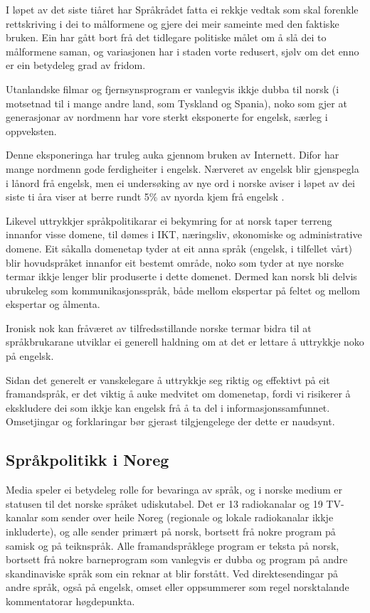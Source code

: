 \begin{multicols}{2}
I løpet av det siste tiåret har Språkrådet fatta ei rekkje vedtak som skal forenkle rettskriving i dei to målformene og gjere dei meir sameinte med den faktiske bruken. Ein har gått bort frå det tidlegare politiske målet om å slå dei to målformene saman, og variasjonen har i staden vorte redusert, sjølv om det enno er ein betydeleg grad av fridom. 

Utanlandske filmar og fjernsynsprogram er vanlegvis ikkje dubba til norsk (i motsetnad til i mange andre land, som Tyskland og Spania), noko som gjer at generasjonar av nordmenn har vore sterkt eksponerte for engelsk, særleg i oppveksten. 

Denne eksponeringa har truleg auka gjennom bruken av Internett. 
Difor har mange nordmenn gode ferdigheiter i engelsk. 
Nærveret av engelsk blir gjenspegla i lånord frå engelsk, men ei undersøking av nye ord i norske aviser i løpet av dei siste ti åra viser at berre rundt 5\% av nyorda kjem frå engelsk \cite{And:2011}.


Likevel uttrykkjer språkpolitikarar ei bekymring \cite{nih:2005} for at norsk taper terreng innanfor visse domene, til dømes i IKT, næringsliv, økonomiske og administrative domene. 
Eit såkalla domenetap tyder at eit anna språk (engelsk, i tilfellet vårt) blir hovudspråket innanfor eit bestemt område, noko som tyder at nye norske termar ikkje lenger blir produserte i dette domenet. Dermed kan norsk bli delvis ubrukeleg som kommunikasjonsspråk, både mellom ekspertar på feltet og mellom ekspertar og ålmenta. 

Ironisk nok kan fråværet av tilfredsstillande norske termar bidra til at språkbrukarane utviklar ei generell haldning om at det er lettare å uttrykkje noko på engelsk. 

Sidan det generelt er vanskelegare å uttrykkje seg riktig og effektivt på eit framandspråk, er det viktig å auke medvitet om domenetap, fordi vi risikerer å ekskludere dei som ikkje kan engelsk frå å ta del i informasjonssamfunnet. 
Omsetjingar og forklaringar bør gjerast tilgjengelege der dette er naudsynt.

\subsection{Språkpolitikk i Noreg}

Media speler ei betydeleg rolle for bevaringa av språk, og i norske medium er statusen til det norske språket udiskutabel. Det er 13 radiokanalar og 19 TV-kanalar som sender over heile Noreg (regionale og lokale radiokanalar ikkje inkluderte), og alle sender primært på norsk, bortsett frå nokre program på samisk og på teiknspråk. 
Alle framandspråklege program er teksta på norsk, bortsett frå nokre barneprogram som vanlegvis er dubba og program på andre skandinaviske språk som ein reknar at blir forstått. 
Ved direktesendingar på andre språk, også på engelsk, omset eller oppsummerer som regel norsktalande kommentatorar høgdepunkta.


\end{multicols}
